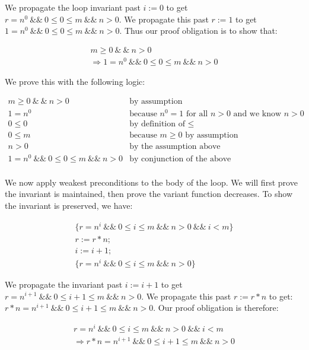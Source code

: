 \documentclass[11pt]{article}
\begin{document}
    We propagate the loop invariant past $i :=0$ to get
    $r=n^0 ~\&\&~ 0 \le 0 \le m ~\&\&~ n > 0$. We propagate this
    past $r :=1$ to get $1=n^0 ~\&\&~ 0 \le 0 \le m ~\&\&~ n > 0$.
    Thus our proof obligation is to show that:

    \[
        \begin{array}{l}
            m \ge 0 ~\&~\&~ n > 0\\
            \Rightarrow 1=n^0 ~\&\&~ 0 \le 0 \le m ~\&\&~ n > 0
        \end{array}
    \]

    We prove this with the following logic:

    \[
        \begin{array}{ll}
            m \ge 0 ~\&~\&~ n > 0 & \mbox{by assumption}\\
            1=n^0 & \mbox{because $n^0=1$ for all $n>0$ and we know $n>0$}\\
            0 \le 0 & \mbox{by definition of $\le$}\\
            0 \le m & \mbox{because $m \ge 0$ by assumption}\\
            n > 0 & \mbox{by the assumption above}\\
            1=n^0 ~\&\&~ 0 \le 0 \le m ~\&\&~ n > 0 & \mbox{by conjunction of the above}\\
        \end{array}
    \]

    We now apply weakest preconditions to the body of the loop. We will
    first prove the invariant is maintained, then prove the variant function
    decreases. To show the invariant is preserved, we have:

    \[
        \begin{array}{l}
            \{ r=n^i ~\&\&~ 0 \le i \le m ~\&\&~ n > 0 ~\&\&~ i < m\}\\
            r := r*n;\\
            i := i+1;\\
            \{ r=n^i ~\&\&~ 0 \le i \le m ~\&\&~ n > 0 \}
        \end{array}
    \]

    We propagate the invariant past $i:=i+1$ to get
    $r=n^{i+1} ~\&\&~ 0 \le i+1 \le m ~\&\&~ n > 0$. We propagate this
    past $r:=r*n$ to get:
    $r*n=n^{i+1} ~\&\&~ 0 \le i+1 \le m ~\&\&~ n > 0$. Our proof
    obligation is therefore:

    \[
        \begin{array}{l}
            r=n^i ~\&\&~ 0 \le i \le m ~\&\&~ n > 0 ~\&\&~ i < m\\
            \Rightarrow r*n=n^{i+1} ~\&\&~ 0 \le i+1 \le m ~\&\&~ n > 0
        \end{array}
    \]
\end{document}
